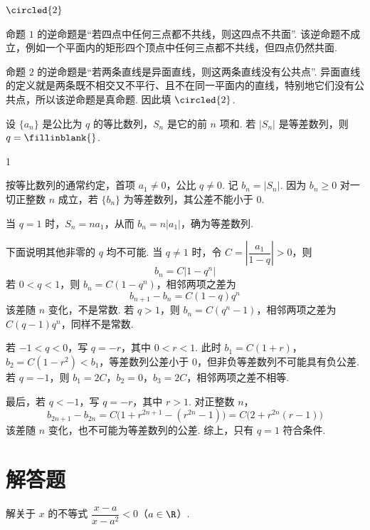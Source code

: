 \begin{answer}
\(\circled{2}\)
\end{answer}

\begin{solution}
命题 \(1\) 的逆命题是“若四点中任何三点都不共线，则这四点不共面”. 该逆命题不成立，例如一个平面内的矩形四个顶点中任何三点都不共线，但四点仍然共面.

命题 \(2\) 的逆命题是“若两条直线是异面直线，则这两条直线没有公共点”. 异面直线的定义就是两条既不相交又不平行、且不在同一平面内的直线，特别地它们没有公共点，所以该逆命题是真命题. 因此填 \(\circled{2}\).
\end{solution}

\begin{problem}
设 \(\{a_n\}\) 是公比为 \(q\) 的等比数列，\(S_n\) 是它的前 \(n\) 项和. 若 \(\lvert S_n\rvert\) 是等差数列，则 \(q=\fillinblank{}\).
\end{problem}

\begin{answer}
1
\end{answer}

\begin{solution}
按等比数列的通常约定，首项 \(a_1\ne0\)，公比 \(q\ne0\). 记 \(b_n=\lvert S_n\rvert\). 因为 \(b_n\geqslant0\) 对一切正整数 \(n\) 成立，若 \(\{b_n\}\) 为等差数列，其公差不能小于 \(0\).

当 \(q=1\) 时，\(S_n=na_1\)，从而 \(b_n=n\lvert a_1\rvert\)，确为等差数列.

下面说明其他非零的 \(q\) 均不可能. 当 \(q\ne1\) 时，令 \(C=\left\lvert\dfrac{a_1}{1-q}\right\rvert>0\)，则
\[
b_n=C\lvert1-q^n\rvert
\]
若 \(0<q<1\)，则 \(b_n=C(1-q^n)\)，相邻两项之差为
\[
b_{n+1}-b_n=C(1-q)q^n
\]
该差随 \(n\) 变化，不是常数. 若 \(q>1\)，则 \(b_n=C(q^n-1)\)，相邻两项之差为 \(C(q-1)q^n\)，同样不是常数.

若 \(-1<q<0\)，写 \(q=-r\)，其中 \(0<r<1\). 此时 \(b_1=C(1+r)\)，\(b_2=C(1-r^2)<b_1\)，等差数列公差小于 \(0\)，但非负等差数列不可能具有负公差. 若 \(q=-1\)，则 \(b_1=2C\)，\(b_2=0\)，\(b_3=2C\)，相邻两项之差不相等.

最后，若 \(q<-1\)，写 \(q=-r\)，其中 \(r>1\). 对正整数 \(n\)，
\[
b_{2n+1}-b_{2n}=C\bigl(1+r^{2n+1}-(r^{2n}-1)\bigr)=C\bigl(2+r^{2n}(r-1)\bigr)
\]
该差随 \(n\) 变化，也不可能为等差数列的公差. 综上，只有 \(q=1\) 符合条件.
\end{solution}

\section{解答题}
\begin{problem}
解关于 \(x\) 的不等式 \(\dfrac{x-a}{x-a^2}<0\)（\(a\in\R\)）.
\end{problem}

